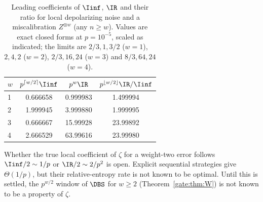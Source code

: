 \begin{table}[!tbp]
\centering
\caption{Leading coefficients of $\Iinf$, $\IR$ and their ratio for local depolarizing noise and a miscalibration $Z^{\otimes w}$ (any $n\ge w$). Values are exact closed forms at $p=10^{-5}$, scaled as indicated; the limits are $2/3,1,3/2$ ($w=1$), $2,4,2$ ($w=2$), $2/3,16,24$ ($w=3$) and $8/3,64,24$ ($w=4$).}
\label{gate:tab:Sweight}
\begin{tabular}{lccc}
\toprule
$w$ & $p^{\lceil w/2\rceil}\Iinf$ & $p^w\IR$ & $p^{\lfloor w/2\rfloor}\IR/\Iinf$\\
\midrule
1 & 0.666658 & 0.999983 & 1.499994\\
2 & 1.999945 & 3.999880 & 1.999995\\
3 & 0.666667 & 15.99928 & 23.99892\\
4 & 2.666529 & 63.99616 & 23.99980\\
\bottomrule
\end{tabular}
\end{table}

Whether the true local coefficient of $\zeta$ for a weight-two error follows $\Iinf/2\sim1/p$ or $\IR/2\sim2/p^2$ is open. Explicit sequential strategies give $\Theta(1/p)$, but their relative-entropy rate is not known to be optimal. Until this is settled, the $p^{w/2}$ window of $\DBS$ for $w\ge2$ (Theorem~\ref{gate:thm:W}) is not known to be a property of $\zeta$.

